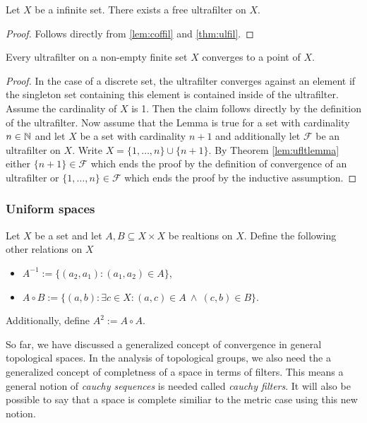 \begin{col}\label{col:exfreeuf}
  Let $X$ be a infinite set. There exists a free ultrafilter on $X$.
\end{col}

\begin{proof}
  Follows directly from \ref{lem:coffil} and \ref{thm:ulfil}.
\end{proof}

\begin{lemma}
  Every ultrafilter on a non-empty finite set $X$ converges to a point of $X$.
\end{lemma}

\begin{proof}
  In the case of a discrete set, the ultrafilter converges against an element if the singleton set containing this element is contained inside of the ultrafilter.
  Assume the cardinality of $X$ is 1. Then the claim follows directly by the definition of the ultrafilter.
Now assume that the Lemma is true for a set with cardinality $n \in \mathbb{N}$ and let $X$ be a set with cardinality $n+1$ and additionally let $\mathcal{F}$ be an ultrafilter on $X$. Write $X = \{1, \ldots, n\} \cup \{n+1\}$. By Theorem \ref{lem:ufltlemma} either $\{n+1\} \in \mathcal{F}$ which ends the proof by the definition of convergence of an ultrafilter or $\{1,\ldots,n\} \in \mathcal{F}$ which ends the proof by the inductive assumption.
\end{proof}

\subsubsection{Uniform spaces}

\begin{defin}
  Let $X$ be a set and let $A, B \subseteq X \times X$ be realtions on $X$.
  Define the following other relations on $X$
  \begin{itemize}
    \item $A^{-1} := \{(a_2, a_1)\colon (a_1, a_2) \in A\}$,
    \item $A \circ B := \{(a, b)\colon \exists c \in X\colon (a, c) \in A \: \land \: (c, b) \in B\}$.
  \end{itemize}
  Additionally, define $A^2 := A \circ A$.  
\end{defin}

So far, we have discussed a generalized concept of convergence in general topological spaces. In the analysis of topological groups, we also need the a generalized concept of completness of a space in terms of filters. This means a general notion of \textit{cauchy sequences} is needed called \textit{cauchy filters}. It will also be possible to say that a space is complete similiar to the metric case using this new notion.


